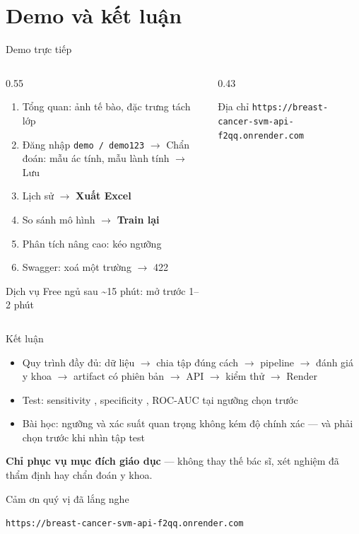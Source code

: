 \documentclass[aspectratio=169,12pt]{beamer}
\newcommand{\canhbao}{%
  \colorbox{warnbg}{\parbox{0.96\textwidth}{\small\textbf{Chỉ phục vụ mục đích giáo dục} --- không thay thế
  bác sĩ, xét nghiệm đã thẩm định hay chẩn đoán y khoa.}}}
\begin{document}
\section{Demo và kết luận}

\begin{frame}{Demo trực tiếp}
  \begin{columns}[T]
    \begin{column}{0.55\textwidth}
      \begin{enumerate}
        \item Tổng quan: ảnh tế bào, đặc trưng tách lớp
        \item Đăng nhập \texttt{demo / demo123} $\rightarrow$ Chẩn đoán: mẫu ác tính, mẫu lành tính $\rightarrow$ Lưu
        \item Lịch sử $\rightarrow$ \textbf{Xuất Excel}
        \item So sánh mô hình $\rightarrow$ \textbf{Train lại}
        \item Phân tích nâng cao: kéo ngưỡng
        \item Swagger: xoá một trường $\rightarrow$ \alert{422}
      \end{enumerate}
      \vspace{8pt}
      \small Dịch vụ Free ngủ sau \textasciitilde15 phút: mở trước 1--2 phút
    \end{column}
    \begin{column}{0.43\textwidth}
      \begin{block}{Địa chỉ}
        \centering\small
        \texttt{https://breast-cancer-svm-api-f2qq.onrender.com}
      \end{block}
    \end{column}
  \end{columns}
\end{frame}

\begin{frame}{Kết luận}
  \begin{itemize}
    \item Quy trình đầy đủ: dữ liệu $\rightarrow$ chia tập đúng cách $\rightarrow$ pipeline $\rightarrow$ đánh giá y khoa
          $\rightarrow$ artifact có phiên bản $\rightarrow$ API $\rightarrow$ kiểm thử $\rightarrow$ Render
    \item Test: sensitivity \TestSens, specificity \TestSpec, ROC-AUC \TestAUC{} tại ngưỡng \Threshold{} chọn trước
    \item Bài học: ngưỡng và xác suất quan trọng không kém độ chính xác --- và phải chọn \alert{trước} khi nhìn tập test
  \end{itemize}
  \vfill
  \canhbao
\end{frame}

\begin{frame}[plain]
  \centering
  \vfill
  {\Large Cảm ơn quý vị đã lắng nghe}
  \vspace{12pt}

  \texttt{https://breast-cancer-svm-api-f2qq.onrender.com}
  \vfill
\end{frame}
\end{document}
